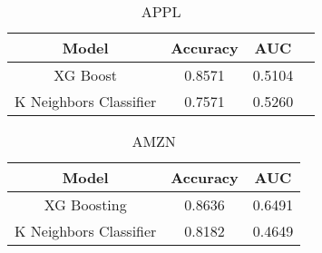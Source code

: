 \documentclass{article}
\title{}
\author{}
\date{}
\begin{document}
\maketitle

\begin{table}[h]
\centering
\begin{tabular}{cccc}
\hline
\textbf{Model} & \textbf{Accuracy} & \textbf{AUC}  \\ \hline
XG Boost &    0.8571 & 0.5104 \\
K Neighbors Classifier &    0.7571 & 0.5260 \\\hline
\end{tabular}
\caption{APPL}
\end{table}

\begin{table}[h]
\centering
\begin{tabular}{ccc}
\hline
\textbf{Model} & \textbf{Accuracy} & \textbf{AUC} \\ \hline
XG Boosting & 0.8636 & 0.6491 \\
K Neighbors Classifier & 0.8182 & 0.4649 \\ \hline
\end{tabular}
\caption{AMZN}
\end{table}
\end{document}
